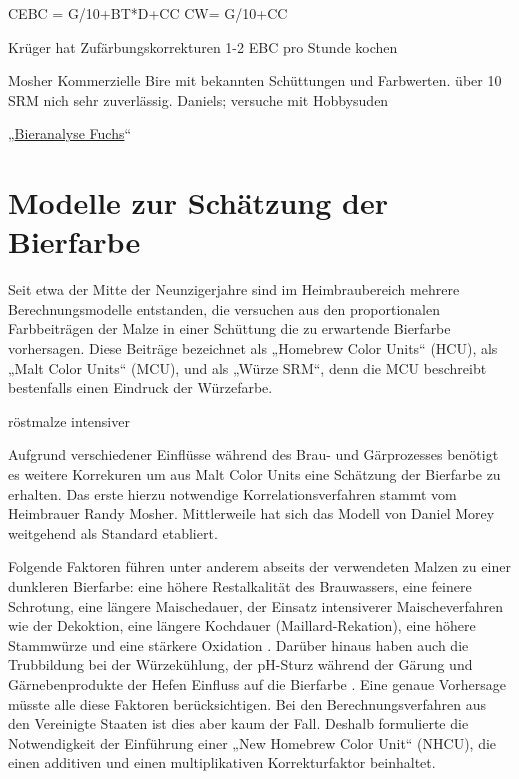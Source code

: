 \documentclass[a4paper,parskip=half]{scrartcl}
\begin{document}
CEBC = G/10+BT*D+CC
CW= G/10+CC

Krüger hat Zufärbungskorrekturen
1-2 EBC pro Stunde kochen

Mosher Kommerzielle Bire mit bekannten Schüttungen und Farbwerten. über 10 SRM nich sehr zuverlässig.
Daniels; versuche mit Hobbysuden

„\href{https://bieranalyse.de}{Bieranalyse Fuchs}“

\section*{Modelle zur Schätzung der Bierfarbe}

Seit etwa der Mitte der Neunzigerjahre sind im Heimbraubereich mehrere Berechnungsmodelle entstanden, die versuchen aus den proportionalen Farbbeiträgen der Malze in einer Schüttung die zu erwartende Bierfarbe vorhersagen. Diese Beiträge bezeichnet \textcite[34]{Mosher1994} als „Homebrew Color Units“ (HCU), \textcite[61]{Daniels1996} als „Malt Color Units“ (MCU), und \textcite[10]{Holle2010} als „Würze SRM“, denn die MCU beschreibt bestenfalls einen Eindruck der Würzefarbe.

röstmalze intensiver
\parencite{KrausWeyermann2021c}

Aufgrund verschiedener Einflüsse während des Brau- und Gärprozesses benötigt es weitere Korrekuren um aus Malt Color Units eine Schätzung der Bierfarbe zu erhalten. Das erste hierzu notwendige Korrelationsverfahren stammt vom Heimbrauer Randy Mosher. Mittlerweile hat sich das Modell von Daniel Morey weitgehend als Standard etabliert. \parencite{KrausWeyermann2021b}

Folgende Faktoren führen unter anderem abseits der verwendeten Malzen zu einer dunkleren Bierfarbe: eine höhere Restalkalität des Brauwassers, eine feinere Schrotung, eine längere Maischedauer, der Einsatz intensiverer Maischeverfahren wie der Dekoktion, eine längere Kochdauer (Maillard-Rekation), eine höhere Stammwürze und eine stärkere Oxidation \parencites{KrausWeyermann2021c}[78]{Hanghofer2019}. Darüber hinaus haben auch die Trubbildung bei der Würzekühlung, der pH-Sturz während der Gärung und  Gärnebenprodukte der Hefen Einfluss auf die Bierfarbe \parencites{KrausWeyermann2021c}. Eine genaue Vorhersage müsste alle diese Faktoren berücksichtigen. Bei den Berechnungsverfahren aus den Vereinigte Staaten ist dies aber kaum der Fall. Deshalb formulierte \textcite{Colby2000} die Notwendigkeit der Einführung einer „New Homebrew Color Unit“ (NHCU), die einen additiven und einen multiplikativen Korrekturfaktor beinhaltet.
\end{document}
